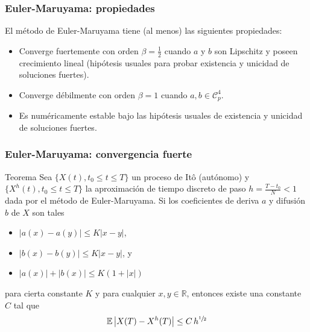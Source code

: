 \documentclass[10pt]{beamer}
\newcommand{\abs}[1]{\ensuremath{\left\lvert #1 \right\rvert}}
\newcommand{\Real}{\mathbb{R}}
\newcommand{\Exp}[1]{\ensuremath{\mathbb{E} #1}}
\begin{document}
\frame
{
    \frametitle{Euler-Maruyama: propiedades}

    El método de Euler-Maruyama tiene (al menos) las siguientes propiedades:

    \begin{itemize}
        \item<2-> Converge fuertemente con orden $\beta = \frac{1}{2}$
        cuando $a$ y $b$ son Lipschitz y poseen crecimiento lineal (hipótesis usuales para
        probar existencia y unicidad de soluciones fuertes).

        \item<3-> Converge débilmente con orden $\beta = 1$ cuando $a, b \in \mathcal{C}^4_p$.

        \item<4-> Es numéricamente estable bajo las hipótesis usuales de existencia y unicidad
        de soluciones fuertes.
    \end{itemize}

}

\frame
{
    \frametitle{Euler-Maruyama: convergencia fuerte}

    \begin{block}{Teorema}
    Sea $\{X(t), t_0 \leq t \leq T\}$ un proceso de Itô (autónomo) y $\{X^h(t), t_0 \leq t \leq T\}$
    la aproximación de tiempo discreto de paso $h = \frac{T-t_0}{N} < 1$ dada por el método de Euler-Maruyama.
    Si los coeficientes de deriva $a$ y difusión $b$ de $X$ son tales
    \begin{itemize}
        \item $\abs{a(x) - a(y)} \leq K \abs{x-y}$,
        \item $\abs{b(x) - b(y)} \leq K \abs{x-y}$, y
        \item $\abs{a(x)} + \abs{b(x)} \leq K (1 + \abs{x})$
    \end{itemize}
    para cierta constante $K$ y para cualquier $x, y \in \Real$, entonces
    existe una constante $C$ tal que
    $$\Exp{\abs{X(T) - X^h(T)}} \leq C \, h^{\sfrac{1}{2}}$$
    \end{block}
}
\end{document}

